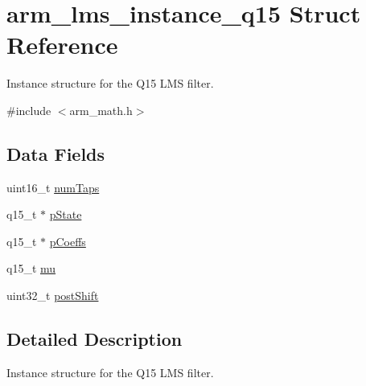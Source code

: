 \hypertarget{structarm__lms__instance__q15}{\section{arm\-\_\-lms\-\_\-instance\-\_\-q15 Struct Reference}
\label{structarm__lms__instance__q15}
}


Instance structure for the Q15 L\-M\-S filter.  




{\ttfamily \#include $<$arm\-\_\-math.\-h$>$}

\subsection*{Data Fields}
\begin{DoxyCompactItemize}
\item 
uint16\-\_\-t \hyperlink{structarm__lms__instance__q15_a751941891e47f522a7f5375fe8990aac}{num\-Taps}
\item 
q15\-\_\-t $\ast$ \hyperlink{structarm__lms__instance__q15_ae29dfdb736374fcddaeaec4b7770170c}{p\-State}
\item 
q15\-\_\-t $\ast$ \hyperlink{structarm__lms__instance__q15_a7ca181a37f714d174445f486bebce26f}{p\-Coeffs}
\item 
q15\-\_\-t \hyperlink{structarm__lms__instance__q15_aab4745770bd667de040227eec1b5ff8d}{mu}
\item 
uint32\-\_\-t \hyperlink{structarm__lms__instance__q15_aa2cacddfc5e1d86905d7d31a18b1979b}{post\-Shift}
\end{DoxyCompactItemize}


\subsection{Detailed Description}
Instance structure for the Q15 L\-M\-S filter. 

